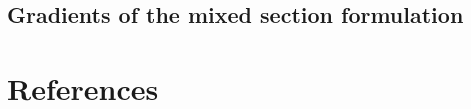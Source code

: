\begin{Notation}[section]
\begin{appendices}

\chapter{Gradients of the mixed section formulation}







\end{appendices}

\end{Notation}


\clearpage
\chapter{References}\label{sec:references}
\printbibliography[heading=none]




